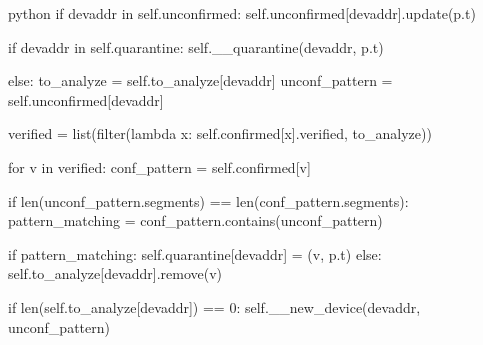 \begin{mintedbox}{python}
if devaddr in self.unconfirmed:
    self.unconfirmed[devaddr].update(p.t)
    
    if devaddr in self.quarantine:
        self.__quarantine(devaddr, p.t)

    else:
        to_analyze = self.to_analyze[devaddr]
        unconf_pattern = self.unconfirmed[devaddr]


        verified = list(filter(lambda x: self.confirmed[x].verified, to_analyze))

        for v in verified:
            conf_pattern = self.confirmed[v]        

            if len(unconf_pattern.segments) == len(conf_pattern.segments):
                pattern_matching = conf_pattern.contains(unconf_pattern)
            
                if pattern_matching:
                    self.quarantine[devaddr] = (v, p.t)      
                else:
                    self.to_analyze[devaddr].remove(v)

        if len(self.to_analyze[devaddr]) == 0:
            self.__new_device(devaddr, unconf_pattern)  
\end{mintedbox}